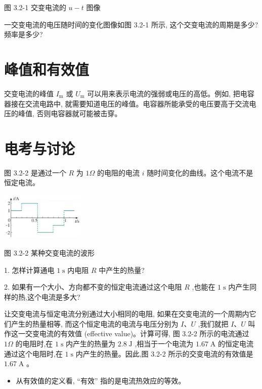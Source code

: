 \documentclass[10pt]{article}
\begin{document}
图 3.2-1 交变电流的 \(u - t\) 图像

一交变电流的电压随时间的变化图像如图 3.2-1 所示, 这个交变电流的周期是多少? 频率是多少?

\section*{峰值和有效值}

交变电流的峰值 \({I}_{\mathrm{m}}\) 或 \({U}_{\mathrm{m}}\) 可以用来表示电流的强弱或电压的高低。例如, 把电容器接在交流电路中, 就需要知道电压的峰值。电容器所能承受的电压要高于交流电压的峰值, 否则电容器就可能被击穿。

\section*{电考与讨论}

图 3.2-2 是通过一个 \(R\) 为 \({1\Omega }\) 的电阻的电流 \(i\) 随时间变化的曲线。这个电流不是恒定电流。

\begin{center}
\includegraphics[max width=0.3\textwidth]{images/01910e72-c5b7-7ed5-a6d4-fb3a5faefc32_60_707668.jpg}
\end{center}

图 3.2-2 某种交变电流的波形

1. 怎样计算通电 \(1\mathrm{\;s}\) 内电阻 \(R\) 中产生的热量?

2. 如果有一个大小、方向都不变的恒定电流通过这个电阻 \(R\) ,也能在 \(1\mathrm{\;s}\) 内产生同样的热,这个电流是多大?

让交变电流与恒定电流分别通过大小相同的电阻, 如果在交变电流的一个周期内它们产生的热量相等, 而这个恒定电流的电流与电压分别为 \(I\text{、}U\) ,我们就把 \(I\text{、}U\) 叫作这一交变电流的有效值 (effective value)。计算可得, 图 3.2-2 所示的电流通过 \({1\Omega }\) 的电阻时,在 \(1\mathrm{\;s}\) 内产生的热量为 \({2.8}\mathrm{\;J}\) ,相当于一个电流为 \({1.67}\mathrm{\;A}\) 的恒定电流通过这个电阻时,在 \(1\mathrm{\;s}\) 内产生的热量。因此,图 3.2-2 所示的交变电流的有效值是 \({1.67}\mathrm{\;A}\) 。

\begin{mdframed}

\begin{itemize}
\item 从有效值的定义看, “有效” 指的是电流热效应的等效。
\end{itemize}

\end{mdframed}
\end{document}
